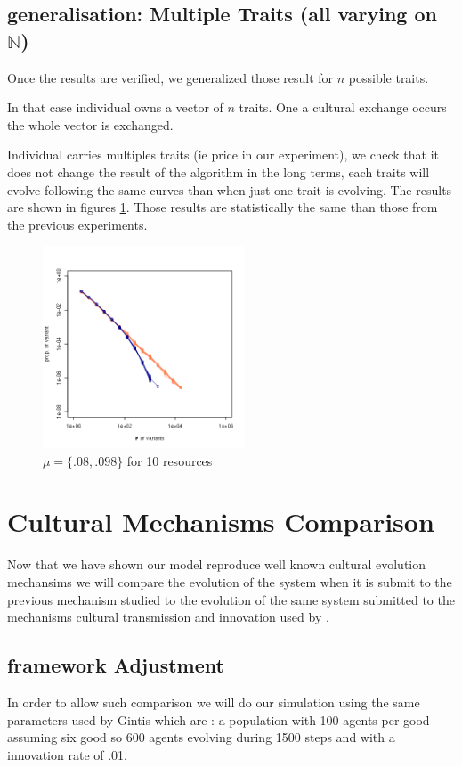 \documentclass[a4paper]{article}
\begin{document}
\subsection{generalisation: Multiple Traits (all varying on $\mathbb{N}$)}
Once the results are verified, we generalized those result for $n$ possible traits.

In that case individual owns a vector of $n$ traits. One a cultural exchange occurs the whole vector is exchanged.

Individual carries multiples traits (ie price in our experiment), we check that it does not change the result of the algorithm in the long terms, each traits will evolve following the same curves than when just one trait is evolving. The results are shown in figures \ref{fig:10resources}. Those results are statistically the same than those from the previous experiments.
\begin{figure}[h]
	\begin{center}
		\includegraphics[width=6cm]{img/10resources.png}
	\end{center}
	\caption{$\mu=\{.08,.098\}$ for 10 resources}
	\label{fig:10resources}
\end{figure}


\section{Cultural Mechanisms Comparison}

Now that we have shown our model reproduce well known cultural evolution mechansims we will compare the evolution of the system when it is submit to the previous mechanism studied to the evolution of the same system submitted to the mechanisms cultural transmission and innovation used by \cite{gintis2006theemergenceofapricesystemfromdecentralizedbilateralexchange}.

\subsection{framework Adjustment}
In order to allow such comparison we will do our simulation using the same parameters used by Gintis which are : a population with 100 agents per good assuming six good so 600 agents evolving during 1500 steps and with a innovation rate of .01.
\end{document}
